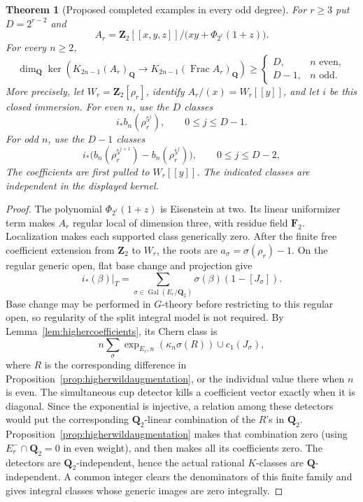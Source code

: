 \documentclass[11pt,a4paper]{article}
\newtheorem{theorem}{Theorem}[section]
\theoremstyle{remark}
\newcommand{\Q}{\mathbf Q}
\newcommand{\Z}{\mathbf Z}
\newcommand{\F}{\mathbf F}
\newcommand{\Frac}{\operatorname{Frac}}
\newcommand{\Gal}{\operatorname{Gal}}
\begin{document}
\begin{theorem}[Proposed completed examples in every odd degree]
\label{thm:completedhigherodd}
For $r\geq3$ put $D=2^{r-2}$ and
\[
 A_r=\Z_2[[x,y,z]]/
 \bigl(xy+\Phi_{2^r}(1+z)\bigr).
\]
For every $n\geq2$,
\[
 \dim_{\Q}\ker\left(K_{2n-1}(A_r)_{\Q}
       \longrightarrow K_{2n-1}(\Frac A_r)_{\Q}\right)
 \geq
 \begin{cases}
 D,& n\text{ even},\\
 D-1,& n\text{ odd}.
 \end{cases}
\]
More precisely, let $W_r=\Z_2[\rho_r]$, identify
$A_r/(x)=W_r[[y]]$, and let $i$ be this closed immersion.
For even $n$, use the $D$ classes
\[
 i_*b_n(\rho_r^{5^j}),\qquad 0\leq j\leq D-1.
\]
For odd $n$, use the $D-1$ classes
\[
 i_*\bigl(b_n(\rho_r^{5^{j+1}})-b_n(\rho_r^{5^j})\bigr),
 \qquad 0\leq j\leq D-2,
\]
The coefficients are first pulled to $W_r[[y]]$.
The indicated classes are independent in the displayed kernel.
\end{theorem}
\begin{proof}
The polynomial $\Phi_{2^r}(1+z)$ is Eisenstein at two.
Its linear uniformizer term makes $A_r$ regular local of
dimension three, with residue field $\F_2$.
Localization makes each supported class generically zero.
After the finite free coefficient extension from $\Z_2$ to $W_r$,
the roots are $a_\sigma=\sigma(\rho_r)-1$.
On the regular generic open, flat base change and projection give
\[
 i_*(\beta)|_T
 =\sum_{\sigma\in\Gal(E_r/\Q_2)}
      \sigma(\beta)(1-[J_\sigma]).
\]
Base change may be performed in $G$-theory before restricting
to this regular open, so regularity of the split integral model
is not required. By Lemma~\ref{lem:highercoefficients}, its Chern
class is
\[
 n\sum_\sigma
 \exp_{E_r,n}(\kappa_n\sigma(R))\cup c_1(J_\sigma),
\]
where $R$ is the corresponding difference in
Proposition~\ref{prop:higherwildaugmentation}, or the individual
value there when $n$ is even.
The simultaneous cup detector kills a coefficient vector exactly
when it is diagonal. Since the exponential is injective, a
relation among these detectors would put the corresponding
$\Q_2$-linear combination of the $R$'s in $\Q_2$.
Proposition~\ref{prop:higherwildaugmentation} makes that combination
zero (using $E_r^-\cap\Q_2=0$ in even weight), and then makes
all its coefficients zero.
The detectors are $\Q_2$-independent, hence the actual rational
$K$-classes are $\Q$-independent. A common integer clears the
denominators of this finite family and gives integral classes
whose generic images are zero integrally.
\end{proof}
\end{document}
